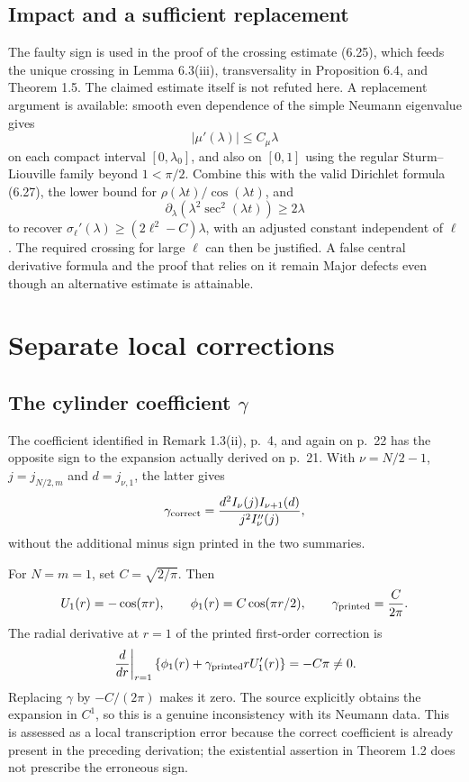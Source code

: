 \documentclass[10pt]{article}
\begin{document}
\subsection*{Impact and a sufficient replacement}
The faulty sign is used in the proof of the crossing estimate (6.25), which feeds the unique crossing in Lemma 6.3(iii), transversality in Proposition 6.4, and Theorem 1.5. The claimed estimate itself is not refuted here. A replacement argument is available: smooth even dependence of the simple Neumann eigenvalue gives \[|\mu'(\lambda)|\le C_\mu\lambda\] on each compact interval \([0,\lambda_0]\), and also on \([0,1]\) using the regular Sturm–Liouville family beyond \(1<\pi/2\). Combine this with the valid Dirichlet formula (6.27), the lower bound for \(\rho(\lambda t)/\cos(\lambda t)\), and \[\partial_\lambda\!\left(\lambda^2\sec^2(\lambda t)\right)\ge2\lambda\] to recover \(\sigma_\ell'(\lambda)\ge(2\ell^2-C)\lambda\), with an adjusted constant independent of \(\ell\). The required crossing for large \(\ell\) can then be justified. A false central derivative formula and the proof that relies on it remain Major defects even though an alternative estimate is attainable.\par
\section*{Separate local corrections}
\subsection*{The cylinder coefficient \(\gamma\)}
The coefficient identified in Remark 1.3(ii), p. 4, and again on p. 22 has the opposite sign to the expansion actually derived on p. 21. With \(\nu=N/2-1\), \(j=j_{N/2,m}\) and \(d=j_{\nu,1}\), the latter gives \[\gamma_{\rm correct}
 =\frac{d^2I_\nu(j)I_{\nu+1}(d)}{j^2I_\nu''(j)},\] without the additional minus sign printed in the two summaries.\par
For \(N=m=1\), set \(C=\sqrt{2/\pi}\). Then \[U_1(r)=-\cos(\pi r),\qquad
\phi_1(r)=C\cos(\pi r/2),\qquad
\gamma_{\rm printed}=\frac{C}{2\pi}.\] The radial derivative at \(r=1\) of the printed first-order correction is \[\left.\frac{d}{dr}\right|_{r=1}
 \{\phi_1(r)+\gamma_{\rm printed}rU_1'(r)\}=-C\pi\ne0.\] Replacing \(\gamma\) by \(-C/(2\pi)\) makes it zero. The source explicitly obtains the expansion in \(C^1\), so this is a genuine inconsistency with its Neumann data. This is assessed as a local transcription error because the correct coefficient is already present in the preceding derivation; the existential assertion in Theorem 1.2 does not prescribe the erroneous sign.\par
\end{document}
